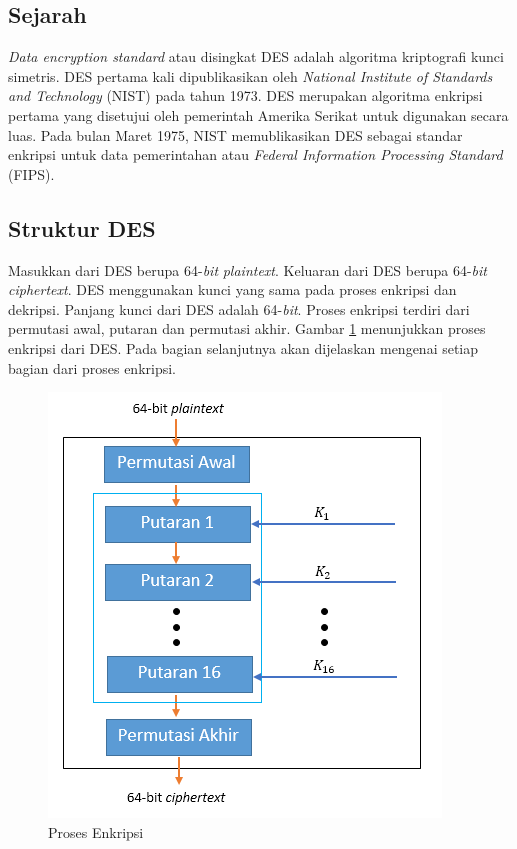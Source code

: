 \subsection{Sejarah}

\textit{Data encryption standard} atau disingkat DES adalah algoritma kriptografi kunci simetris. DES pertama kali dipublikasikan oleh \textit{National Institute of Standards and Technology} (NIST) pada tahun 1973. DES merupakan algoritma enkripsi pertama yang disetujui oleh pemerintah Amerika Serikat untuk digunakan secara luas. Pada bulan Maret 1975, NIST memublikasikan DES sebagai standar enkripsi untuk data pemerintahan atau \textit{Federal Information Processing Standard} (FIPS).

\subsection{Struktur DES}

Masukkan dari DES berupa 64-\textit{bit} \textit{plaintext}. Keluaran dari DES berupa 64-\textit{bit} \textit{ciphertext}. DES menggunakan kunci yang sama pada proses enkripsi dan dekripsi. Panjang kunci dari DES adalah 64-\textit{bit}. Proses enkripsi terdiri dari permutasi awal, putaran dan permutasi akhir. Gambar \ref{fig:prosesenkripsi} menunjukkan proses enkripsi dari DES. Pada bagian selanjutnya akan dijelaskan mengenai setiap bagian dari proses enkripsi.

\begin{figure}[H]
	\includegraphics[scale=0.8]{Gambar/proses_enkripsi_des}
	\centering
	\caption{Proses Enkripsi}\label{fig:prosesenkripsi}
\end{figure}

